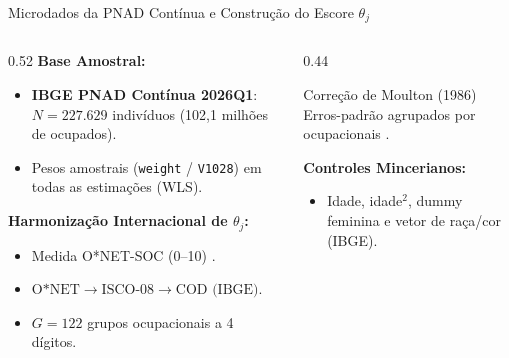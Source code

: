 \documentclass[aspectratio=169, 10pt]{beamer}
\begin{document}
\begin{frame}{Microdados da PNAD Contínua e Construção do Escore $\theta_j$}
    \begin{columns}[T]
        \begin{column}{0.52\textwidth}
            \textbf{Base Amostral:}
            \begin{itemize}
                \item \textbf{IBGE PNAD Contínua 2026Q1}: $N = 227.629$
                indivíduos (102,1 milhões de ocupados).
                \item Pesos amostrais (\texttt{weight} / \texttt{V1028})
                em todas as estimações (WLS).
            \end{itemize}

            \vspace{0.2em}
            \textbf{Harmonização Internacional de $\theta_j$:}
            \begin{itemize}
                \item Medida O*NET-SOC (0--10) \citep{eloundou2024gpts}.
                \item $\text{O*NET} \to \text{ISCO-08} \to \text{COD (IBGE)}$.
                \item $G = 122$ grupos ocupacionais a 4 dígitos.
            \end{itemize}
        \end{column}

        \begin{column}{0.44\textwidth}
            \begin{block}{Correção de Moulton (1986)}
                Erros-padrão agrupados por 
                ocupacionais \citep{cameron2008bootstrap}.
            \end{block}

            \vspace{0.3em}
            \textbf{Controles Mincerianos:}
            \begin{itemize}
                \item Idade, idade$^2$, dummy feminina e
                vetor de raça/cor (IBGE).
            \end{itemize}
        \end{column}
    \end{columns}
\end{frame}
\end{document}
